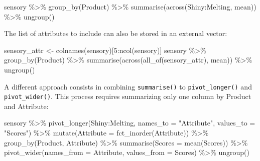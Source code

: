 \documentclass[
]{krantz}
\makeatletter
\newenvironment{Shaded}{\begin{snugshade}}{\end{snugshade}}
\newcommand{\AttributeTok}[1]{\textcolor[rgb]{0.61,0.61,0.61}{#1}}
\newcommand{\DecValTok}[1]{\textcolor[rgb]{0.06,0.06,0.06}{#1}}
\newcommand{\FunctionTok}[1]{\textcolor[rgb]{0,0,0}{#1}}
\newcommand{\NormalTok}[1]{#1}
\newcommand{\OtherTok}[1]{\textcolor[rgb]{0.37,0.37,0.37}{#1}}
\newcommand{\SpecialCharTok}[1]{\textcolor[rgb]{0,0,0}{#1}}
\newcommand{\StringTok}[1]{\textcolor[rgb]{0.5,0.5,0.5}{#1}}
\newenvironment{kframe}{%
\medskip{}
\setlength{\fboxsep}{.8em}
 \def\at@end@of@kframe{}%
 \ifinner\ifhmode%
  \def\at@end@of@kframe{\end{minipage}}%
  \begin{minipage}{\columnwidth}%
 \fi\fi%
 \def\FrameCommand##1{\hskip\@totalleftmargin \hskip-\fboxsep
 \colorbox{shadecolor}{##1}\hskip-\fboxsep
     \hskip-\linewidth \hskip-\@totalleftmargin \hskip\columnwidth}%
 \MakeFramed {\advance\hsize-\width
   \@totalleftmargin\z@ \linewidth\hsize
   \@setminipage}}%
 {\par\unskip\endMakeFramed%
 \at@end@of@kframe}
\renewenvironment{Shaded}{\begin{kframe}}{\end{kframe}}
\makeatother
\begin{document}
\begin{Shaded}
\begin{Highlighting}[]
\NormalTok{sensory }\SpecialCharTok{\%\textgreater{}\%}
  \FunctionTok{group\_by}\NormalTok{(Product) }\SpecialCharTok{\%\textgreater{}\%}
  \FunctionTok{summarise}\NormalTok{(}\FunctionTok{across}\NormalTok{(Shiny}\SpecialCharTok{:}\NormalTok{Melting, mean)) }\SpecialCharTok{\%\textgreater{}\%}
  \FunctionTok{ungroup}\NormalTok{()}
\end{Highlighting}
\end{Shaded}

The list of attributes to include can also be stored in an external vector:

\begin{Shaded}
\begin{Highlighting}[]
\NormalTok{sensory\_attr }\OtherTok{\textless{}{-}} \FunctionTok{colnames}\NormalTok{(sensory)[}\DecValTok{5}\SpecialCharTok{:}\FunctionTok{ncol}\NormalTok{(sensory)]}
\NormalTok{sensory }\SpecialCharTok{\%\textgreater{}\%}
  \FunctionTok{group\_by}\NormalTok{(Product) }\SpecialCharTok{\%\textgreater{}\%}
  \FunctionTok{summarise}\NormalTok{(}\FunctionTok{across}\NormalTok{(}\FunctionTok{all\_of}\NormalTok{(sensory\_attr), mean)) }\SpecialCharTok{\%\textgreater{}\%}
  \FunctionTok{ungroup}\NormalTok{()}
\end{Highlighting}
\end{Shaded}

A different approach consists in combining \texttt{summarise()} to \texttt{pivot\_longer()} and \texttt{pivot\_wider()}. This process requires summarizing only one column by Product and Attribute:

\begin{Shaded}
\begin{Highlighting}[]
\NormalTok{sensory }\SpecialCharTok{\%\textgreater{}\%}
  \FunctionTok{pivot\_longer}\NormalTok{(Shiny}\SpecialCharTok{:}\NormalTok{Melting, }
               \AttributeTok{names\_to =} \StringTok{"Attribute"}\NormalTok{, }\AttributeTok{values\_to =} \StringTok{"Scores"}\NormalTok{) }\SpecialCharTok{\%\textgreater{}\%}
  \FunctionTok{mutate}\NormalTok{(}\AttributeTok{Attribute =} \FunctionTok{fct\_inorder}\NormalTok{(Attribute)) }\SpecialCharTok{\%\textgreater{}\%}
  \FunctionTok{group\_by}\NormalTok{(Product, Attribute) }\SpecialCharTok{\%\textgreater{}\%}
  \FunctionTok{summarise}\NormalTok{(}\AttributeTok{Scores =} \FunctionTok{mean}\NormalTok{(Scores)) }\SpecialCharTok{\%\textgreater{}\%}
  \FunctionTok{pivot\_wider}\NormalTok{(}\AttributeTok{names\_from =}\NormalTok{ Attribute, }\AttributeTok{values\_from =}\NormalTok{ Scores) }\SpecialCharTok{\%\textgreater{}\%}
  \FunctionTok{ungroup}\NormalTok{()}
\end{Highlighting}
\end{Shaded}
\end{document}
